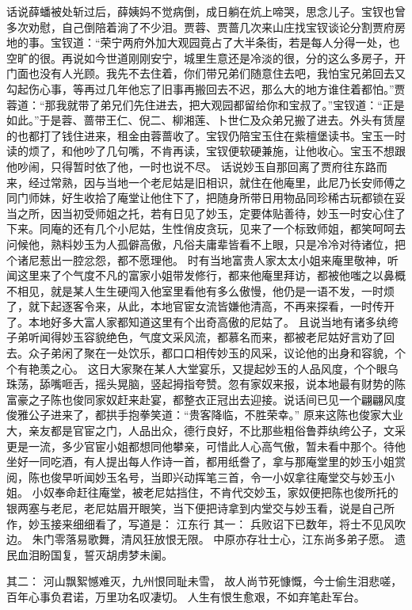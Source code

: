 \documentclass[12pt,oneside]{book}
\begin{document}
话说薛蟠被处斩过后，薛姨妈不觉病倒，成日躺在炕上啼哭，思念儿子。宝钗也曾多次劝慰，自己倒陪着淌了不少泪。贾蓉、贾蔷几次来山庄找宝钗谈论分割贾府房地的事。宝钗道：“荣宁两府外加大观园竟占了大半条街，若是每人分得一处，也空旷的很。再说如今世道刚刚安宁，城里生意还是冷淡的很，分的这么多房子，开门面也没有人光顾。我先不去住着，你们带兄弟们随意住去吧，我怕宝兄弟回去又勾起伤心事，等再过几年他忘了旧事再搬回去不迟，那么大的地方谁住着都怕。”贾蓉道：“那我就带了弟兄们先住进去，把大观园都留给你和宝叔了。”宝钗道：“正是如此。”于是蓉、蔷带王仁、倪二、柳湘莲、卜世仁及众弟兄搬了进去。外头有赁屋的也都打了钱住进来，租金由蓉蔷收了。宝钗仍陪宝玉住在紫檀堡读书。宝玉一时读的烦了，和他吵了几句嘴，不肯再读，宝钗便软硬兼施，让他收心。宝玉不想跟他吵闹，只得暂时依了他，一时也说不尽。
话说妙玉自那回离了贾府往东路而来，经过常熟，因与当地一个老尼姑是旧相识，就住在他庵里，此尼乃长安师傅之同门师妹，好生收拾了庵堂让他住下了，把随身所带日用物品同珍稀古玩都锁在妥当之所，因当初受师姐之托，若有日见了妙玉，定要体贴善待，妙玉一时安心住了下来。同庵的还有几个小尼姑，生性俏皮贪玩，见来了一个标致师姐，都笑呵呵去问候他，熟料妙玉为人孤僻高傲，凡俗夫庸辈皆看不上眼，只是冷冷对待诸位，把个诸尼惹出一腔忿怨，都不愿理他。
时有当地富贵人家太太小姐来庵里敬神，听闻这里来了个气度不凡的富家小姐带发修行，都来他庵里拜访，都被他嗤之以鼻概不相见，就是某人生生硬闯入他室里看他有多么傲慢，他仍是一语不发，一时烦了，就下起逐客令来，从此，本地官宦女流皆嫌他清高，不再来探看，一时传开了。本地好多大富人家都知道这里有个出奇高傲的尼姑了。
且说当地有诸多纨绔子弟听闻得妙玉容貌绝色，气度文采风流，都慕名而来，都被老尼姑好言劝了回去。众子弟闲了聚在一处饮乐，都口口相传妙玉的风采，议论他的出身和容貌，个个有艳羡之心。
这日大家聚在某人大堂宴乐，又提起妙玉的人品风度，个个眼乌珠荡，舔嘴咂舌，摇头晃脑，竖起拇指夸赞。忽有家奴来报，说本地最有财势的陈富豪之子陈也俊同家奴赶来赴宴，都整衣正冠出去迎接。说话间已见一个翩翩风度俊雅公子进来了，都拱手抱拳笑道：“贵客降临，不胜荣幸。”
原来这陈也俊家大业大，亲友都是官宦之门，人品出众，德行良好，不比那些粗俗鲁莽纨绔公子，文采更是一流，多少官宦小姐都想同他攀亲，可惜此人心高气傲，暂未看中那个。待他坐好一同吃酒，有人提出每人作诗一首，都用纸誊了，拿与那庵堂里的妙玉小姐赏阅，陈也俊早听闻妙玉名号，当即兴动挥笔三首，令一小奴拿往庵堂交与妙玉小姐。
小奴奉命赶往庵堂，被老尼姑挡住，不肯代交妙玉，家奴便把陈也俊所托的银两塞与老尼，老尼姑眉开眼笑，当下便把诗拿到内堂交与妙玉看，说是自己所作，妙玉接来细细看了，写道是：
江东行
其一：
兵败诏下已数年，将士不见风吹边。
朱门零落易歌舞，清风狂放恨无限。
中原亦存壮士心，江东尚多弟子愿。
遗民血泪盼国复，誓灭胡虏梦未阑。

其二：
河山飘絮憾难灭，九州恨同耻未雪，
故人尚节死慷慨，今士偷生泪悲嗟，
百年心事负君诺，万里功名叹凄切。
人生有恨生愈艰，不如弃笔赴军台。
\end{document}
